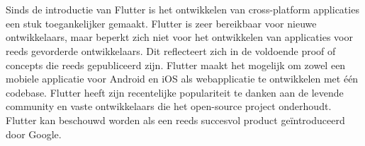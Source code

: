 
\chapter{}
\label{ch:inleiding}

Sinds de introductie van Flutter is het ontwikkelen van cross-platform applicaties een stuk toegankelijker gemaakt. Flutter is zeer bereikbaar voor nieuwe ontwikkelaars, maar beperkt zich niet voor het ontwikkelen van applicaties voor reeds gevorderde ontwikkelaars. Dit reflecteert zich in de voldoende proof of concepts die reeds gepubliceerd zijn. Flutter maakt het mogelijk om zowel een mobiele applicatie voor Android en iOS als webapplicatie te ontwikkelen met één codebase. Flutter heeft zijn recentelijke populariteit te danken aan de levende community en vaste ontwikkelaars die het open-source project onderhoudt. Flutter kan beschouwd worden als een reeds succesvol product geïntroduceerd door Google.
\newline



\section{}
\label{sec:probleemstelling}

